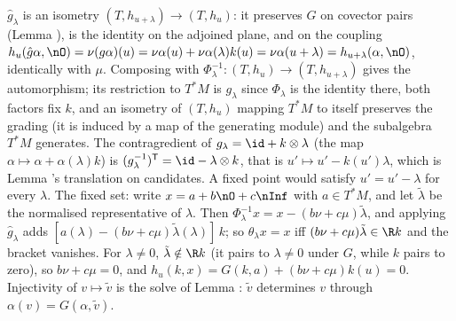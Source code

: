 $\hat g_\lambda$ is an isometry $(T, h_{u+\lambda}) \to (T, h_u)$: it preserves $G$ on covector pairs (Lemma ), is the identity on the adjoined plane, and on the coupling $h_u(\hat g\alpha, \nO) = \nu(g\alpha)(u) = \nu\alpha(u) + \nu\alpha(\lambda)k(u) = \nu\alpha(u+\lambda) = h_{u+\lambda}(\alpha, \nO)$, identically with $\mu$. Composing with $\Phi_\lambda^{-1} : (T, h_u) \to (T, h_{u+\lambda})$ gives the automorphism; its restriction to $T^*M$ is $g_\lambda$ since $\Phi_\lambda$ is the identity there, both factors fix $k$, and an isometry of $(T, h_u)$ mapping $T^*M$ to itself preserves the grading (it is induced by a map of the generating module) and the subalgebra $T^*M$ generates. The contragredient of $g_\lambda = \id + k \otimes \lambda$ (the map $\alpha \mapsto \alpha + \alpha(\lambda)k$) is $(g_\lambda^{-1})^{\mathsf{T}} = \id - \lambda \otimes k$, that is $u' \mapsto u' - k(u')\lambda$, which is Lemma 's translation on candidates. A fixed point would satisfy $u' = u' - \lambda$ for every $\lambda$. The fixed set: write $x = a + b\nO + c\nInf$ with $a \in T^*M$, and let $\tilde\lambda$ be the normalised representative of $\lambda$. Then $\Phi_\lambda^{-1}x = x - (b\nu + c\mu)\tilde\lambda$, and applying $\hat g_\lambda$ adds $[a(\lambda) - (b\nu + c\mu)\tilde\lambda(\lambda)]\,k$; so $\theta_\lambda x = x$ iff $(b\nu + c\mu)\tilde\lambda \in \R k$ and the bracket vanishes. For $\lambda \neq 0$, $\tilde\lambda \notin \R k$ (it pairs to $\lambda \neq 0$ under $G$, while $k$ pairs to zero), so $b\nu + c\mu = 0$, and $h_u(k, x) = G(k, a) + (b\nu + c\mu)k(u) = 0$. Injectivity of $v \mapsto \tilde v$ is the solve of Lemma : $\tilde v$ determines $v$ through $\alpha(v) = G(\alpha, \tilde v)$.
